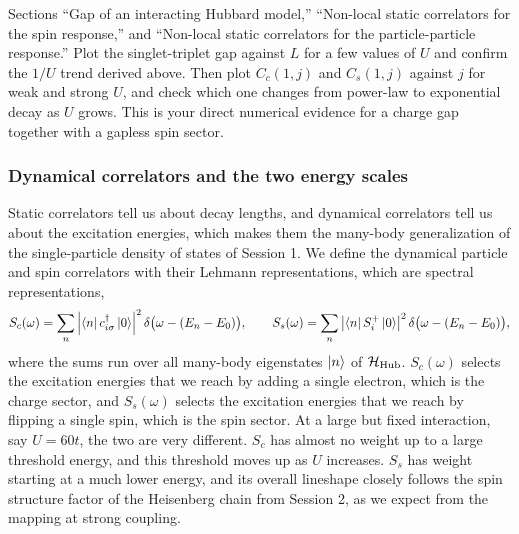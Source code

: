 \documentclass[lecture_notes.tex]{subfiles}
\begin{document}
\begin{notebook}
Sections ``Gap of an interacting Hubbard model,'' ``Non-local static correlators for the spin
response,'' and ``Non-local static correlators for the particle-particle response.'' Plot the
singlet-triplet gap against $L$ for a few values of $U$ and confirm the $1/U$ trend derived above.
Then plot $C_c(1,j)$ and $C_s(1,j)$ against $j$ for weak and strong $U$, and check which one
changes from power-law to exponential decay as $U$ grows. This is your direct numerical evidence for
a charge gap together with a gapless spin sector.
\end{notebook}

\subsubsection{Dynamical correlators and the two energy scales}
Static correlators tell us about decay lengths, and dynamical correlators tell us about the
excitation energies, which makes them the many-body generalization of the single-particle density
of states of Session 1. We define the dynamical particle and spin correlators with their Lehmann
representations, which are spectral representations,
\begin{equation}
  S_c(\omega) = \sum_n \left|\bra{n}c^{\dagger}_{i\sigma}\ket{0}\right|^2 \delta\big(\omega -
  (E_n-E_0)\big), \qquad
  S_s(\omega) = \sum_n \left|\bra{n}S_i^+\ket{0}\right|^2 \delta\big(\omega - (E_n-E_0)\big),
  \label{eq:dynamical}
\end{equation}
where the sums run over all many-body eigenstates $\ket{n}$ of $\mathcal{H}_{\mathrm{Hub}}$. $S_c(\omega)$
selects the excitation energies that we reach by adding a single electron, which is the charge
sector, and $S_s(\omega)$ selects the excitation energies that we reach by flipping a single spin,
which is the spin sector. At a large but fixed interaction, say $U=60t$, the two are very
different. $S_c$ has almost no weight up to a large threshold energy, and this threshold moves up
as $U$ increases. $S_s$ has weight starting at a much lower energy, and its overall lineshape
closely follows the spin structure factor of the Heisenberg chain from Session 2, as we expect from
the mapping at strong coupling.
\end{document}
